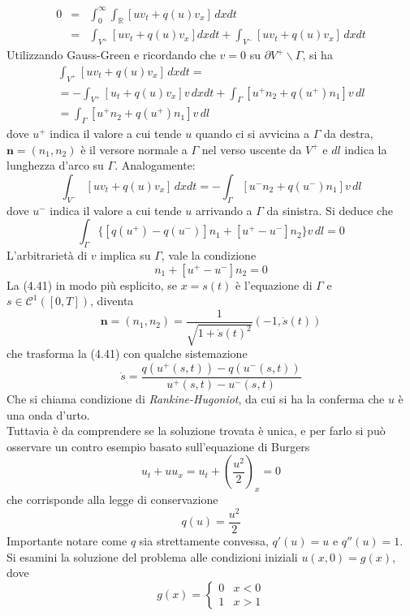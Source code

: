 \documentclass[a4paper,12pt, draft]{article}
\theoremstyle{break}
\numberwithin{equation}{section}
\begin{document}
\begin{eqnarray*}
  0 & = & \int_0^{\infty} \int_{\mathbb{R}} [uv_t + q(u)v_x] \, dxdt \\
  & = & \int_{V^+} [uv_t + q(u)v_x] dxdt + \int_{V^-} [uv_t + q(u)v_x] \, dxdt
\end{eqnarray*} 
Utilizzando Gauss-Green e ricordando che \(v = 0\) su \(\partial V^+ \backslash \Gamma\), si ha
\begin{eqnarray*}
  \int_{V^+} [uv_t + q(u)v_x] \, dxdt = \\
  = -\int_{V^+} [u_t + q(u)v_x]v \, dxdt + \int_{\Gamma} [u^+n_2 + q(u^+)n_1]v \, dl \\
  = \int_{\Gamma} [u^+ n_2 + q(u^+)n_1] v \, dl
\end{eqnarray*}
dove \(u^+\) indica il valore a cui tende \(u\) quando ci si avvicina a \(\Gamma\) da destra, \(\bm{n} = (n_1, n_2)\) è il versore normale a \(\Gamma\) nel verso uscente da \(V^+\) e \(dl\) indica la lunghezza d'arco su \(\Gamma\). 
Analogamente:
\[
  \int_{V^-} [uv_t + q(u)v_x] \, dxdt = -\int_{\Gamma} [u^-n_2 + q(u^-)n_1]v \, dl
\]
dove \(u^-\) indica il valore a cui tende \(u\) arrivando a \(\Gamma\) da sinistra. Si deduce che 
\[
  \int_{\Gamma} \{[q(u^+) - q(u^-)]n_1 + [u^+ - u^-]n_2\} v \, dl = 0
\]
L'arbitrarietà di \(v\) implica su \(\Gamma\), vale la condizione
\begin{equation}
  [q(u^+) - q(u^-)]n_1 + [u^+ - u^-]n_2 = 0
\end{equation}
La (4.41) in modo più esplicito, se \(x = s(t)\) è l'equazione di \(\Gamma\) e \(s \in \mathcal{C}^1([0, T])\), diventa
\[
\bm{n} = (n_1, n_2) = \frac{1}{\sqrt{1 + \dot{s}(t)^2}}(-1, \dot{s}(t))  
\]
che trasforma la (4.41) con qualche sistemazione
\begin{equation}
  \dot{s} = \frac{q(u^+(s,t)) - q(u^- (s,t))}{u^+(s,t) - u^- (s,t)}
\end{equation}
Che si chiama condizione di \emph{Rankine-Hugoniot}, da cui si ha la conferma che \(u\) è una onda d'urto. \\
Tuttavia è da comprendere se la soluzione trovata è unica, e per farlo si può osservare un contro esempio basato sull'equazione di Burgers
\[
u_t + uu_x = u_t +\left(\frac{u^2}{2}\right)_x = 0  
\]
che corrisponde alla legge di conservazione
\[
q(u) = \frac{u^2}{2}  
\]
Importante notare come \(q\) sia strettamente convessa, \(q'(u) = u\) e \(q''(u) = 1\). Si esamini la soluzione del problema alle condizioni iniziali \(u(x,0) = g(x)\), dove 
\[
  g(x) = \begin{cases}
    0 & x < 0 \\
    1 & x > 1
  \end{cases}
\]
\end{document}
